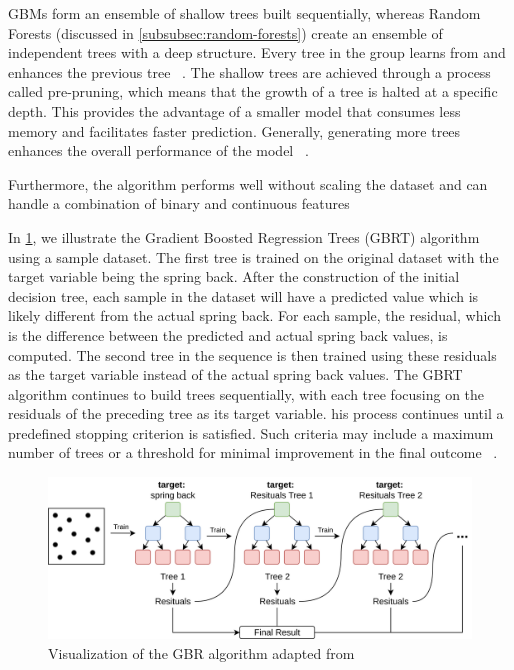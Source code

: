 {GBMs form an ensemble of shallow trees built sequentially, whereas Random Forests (discussed in
\cref{subsubsec:random-forests}) create an ensemble of independent trees with a deep structure.
Every tree in the group learns from and enhances the previous tree
~\cite[p. 221]{boehmke2019hands}.
The shallow trees are achieved through a process called pre-pruning, which means that the growth of a tree is halted
at a specific depth.
This provides the advantage of a smaller model that consumes less memory and facilitates faster prediction.
Generally, generating more trees enhances the overall performance of the
model
~\cite[pp. 74, 88--89]{muller_introductionmachinelearning_2016}.

Furthermore, the algorithm performs well without scaling the dataset and can handle a combination of binary and
continuous features
~\cite[p. 91]{muller_introductionmachinelearning_2016}

In \cref{fig:gbr-example}, we illustrate the Gradient Boosted Regression Trees (GBRT) algorithm using a sample
dataset.
The first tree is trained on the original dataset with the target variable being the spring back.
After the construction of the initial decision tree, each sample in the dataset will have a predicted value which is
likely
different from the actual spring back.
For each sample, the residual, which is the difference between the predicted and actual spring back values, is
computed.
The second tree in the sequence is then trained using these residuals as the target variable instead of the
actual spring back values.
The GBRT algorithm continues to build trees sequentially, with each tree focusing on the residuals of the preceding
tree as its target variable.
his process continues until a predefined stopping criterion is satisfied.
Such criteria may include a maximum number of trees or a threshold for minimal improvement in the final
outcome
~\cite[p. 227]{boehmke2019hands}.

\begin{figure}[h]
    \begin{tcolorbox}[arc=0pt,boxrule=0.5pt]
        \centering
        \includegraphics[width=1\textwidth]{chap4/images/gradient_boosting_example}
    \end{tcolorbox}
    \caption{Visualization of the \ac{GBR} algorithm adapted from~\cite[p. 222]{boehmke2019hands}}
    \label{fig:gbr-example}
\end{figure}

}
